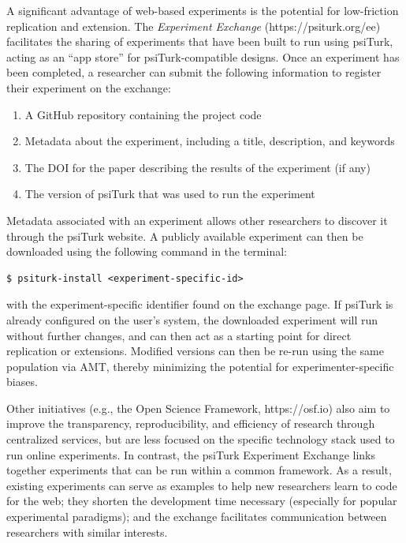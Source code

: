 \documentclass[twocolumn]{svjour3}          %
\newcommand{\psiturk}[0]{\textsf{psiTurk}}
\begin{document}
A significant advantage of web-based experiments is the potential for low-friction replication and extension. 
The \emph{Experiment Exchange} (\textsf{https://psiturk.org/ee}) facilitates the sharing of experiments that have been built to run using \psiturk{}, acting as an ``app store'' for \psiturk{}-compatible designs.
Once an experiment has been completed, a researcher can submit the following information to register their experiment on the exchange:

\begin{enumerate}
\item A GitHub repository containing the project code
\item Metadata about the experiment, including a title, description, and keywords
\item The DOI for the paper describing the results of the experiment (if any)
\item The version of \psiturk{} that was used to run the experiment
\end{enumerate}


Metadata associated with an experiment allows other researchers to discover it through the \psiturk{} website.
A publicly available experiment can then be downloaded using the following command in the terminal:

\begin{lstlisting}
$ psiturk-install <experiment-specific-id>
\end{lstlisting}

\noindent with the experiment-specific identifier found on the exchange page.
If \psiturk{} is already configured on the user's system, the downloaded experiment will run without further changes, and can then act as a starting point for direct replication or extensions.
Modified versions can then be re-run using the same population via AMT, thereby minimizing the potential for experimenter-specific biases.

Other initiatives (e.g., the Open Science Framework, \textsf{https://osf.io}) also aim to improve the transparency, reproducibility, and efficiency of research through centralized services, but are less focused on the specific technology stack used to run online experiments.
In contrast, the \psiturk{} Experiment Exchange links together experiments that can be run within a common framework.
As a result, existing experiments can serve as examples to help new researchers learn to code for the web; they shorten the development time necessary (especially for popular experimental paradigms); and the exchange facilitates communication between researchers with similar interests.
\end{document}
